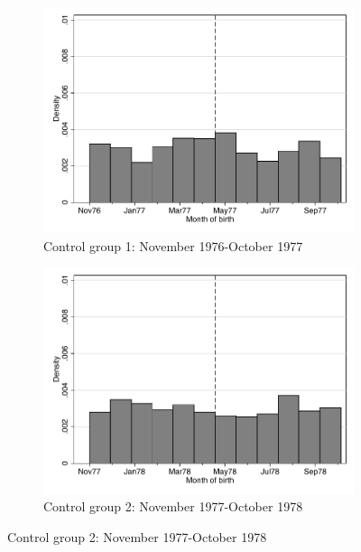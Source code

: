 \documentclass[a4paper ]{article}
\begin{document}


\begin{landscape} 

\begin{figure}[p]\vspace*{-2cm}
\centering
\begin{subfigure}[h]{0.7\textwidth}\centering
	\caption{Control group 1: November 1976-October 1977}
	\includegraphics[width=\textwidth]{../../analysis/graphs/SOEP/fertilityhistcntrl1.pdf}
\end{subfigure}
\quad
\begin{subfigure}[h]{0.7\textwidth}\centering
	\caption{Control group 2: November 1977-October 1978}
	\includegraphics[width=\textwidth]{../../analysis/graphs/SOEP/fertilityhistcntrl2.pdf}
\end{subfigure}


\end{figure}
\end{landscape}
\end{document}
